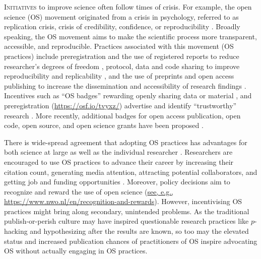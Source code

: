 \documentclass[meta, authordate]{jote-new-article}
\begin{document}
\lettrine{I}{nitiatives} to improve science often follow times of crisis. For example, the open science (OS) movement originated from a crisis in psychology, referred to as replication crisis, crisis of credibility, confidence, or reproducibility \parencite{spellman_open_2018, pashler_editors_2012, baker_dutch_2016, Ioannidis2005, open_science_collaboration_estimating_2015, simmons_false-positive_2011, wagenmakers_agenda_2012, fiedler_voodoo_2011}. Broadly speaking, the OS movement aims to make the scientific process more transparent, accessible, and reproducible. Practices associated with this movement (OS practices) include preregistration and the use of registered reports to reduce researcher's degrees of freedom \parencite{MunafoNosekBishop_2017, chambers_registered_2013}, protocol, data and code sharing to improve reproducibility and replicability \parencite{national_academies_of_sciences_improving_2019}, and the use of preprints and open access publishing to increase the dissemination and accessibility of research findings \parencite{mckiernan_how_2016, mikki_scholarly_2017}. Incentives such as ``OS badges'' rewarding openly sharing data or material   \parencite{kidwell_badges_2016}, and preregistration (\href{https://osf.io/tvyxz/}{https://osf.io/tvyxz/}) advertise and identify ``trustworthy'' research \parencite{schneider_rebuilding_2020}. More recently, additional badges for open access publication, open code, open source, and open science grants have been proposed \parencite{guzman-ramirez_badges_2023}.

There is wide-spread agreement that adopting OS practices has advantages for both science at large as well as the individual researcher \parencite{AllenMehler2019, mckiernan_how_2016, markowetz_five_2015}. Researchers are encouraged to use OS practices to advance their career by increasing their citation count, generating media attention, attracting potential collaborators, and getting job and funding opportunities \parencite{mckiernan_how_2016}. Moreover, policy decisions aim to recognize and reward the use of open science (\href{https://www.nwo.nl/en/recognition-and-rewards}{see, e.g., https://www.nwo.nl/en/recognition-and-rewards}). However, incentivising OS practices might bring along secondary, unintended problems. As the traditional publish-or-perish culture may have inspired questionable research practices like $p$-hacking and hypothesizing after the results are known, so too may the elevated status and increased publication chances of practitioners of OS inspire advocating OS without actually engaging in OS practices.
\end{document}
